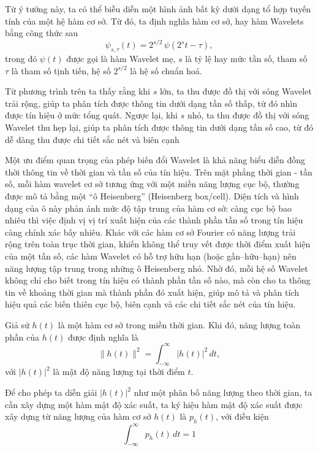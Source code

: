 \documentclass[12pt, a4paper]{report}
\begin{document}
Từ ý tưởng này, ta có thể biễu diễn một hình ảnh bất kỳ dưới dạng tổ hợp tuyến tính của một hệ hàm cơ sở. Từ đó, ta định nghĩa hàm cơ sở, hay hàm Wavelets bằng công thức sau
\begin{equation}
    \psi_{s,\tau}(t) = 2^{s/2}\,\psi(2^{s} t - \tau),
\end{equation}
trong đó $\psi(t)$ được gọi là hàm Wavelet mẹ, 
$s$ là tỷ lệ hay mức tần số, tham số $\tau$ là tham số tịnh tiến, hệ số $2^{s/2}$ là hệ số chuẩn hoá.

Từ phương trình trên ta thấy rằng khi $s$ lớn, ta thu được đồ thị với sóng Wavelet trải rộng, giúp ta phân tích được thông tin dưới dạng tần số thấp, từ đó nhìn được tín hiệu ở mức tổng quát. Ngược lại, khi $s$ nhỏ, ta thu được đồ thị với sóng Wavelet thu hẹp lại, giúp ta phân tích được thông tin dưới dạng tần số cao, từ đó dễ dàng thu được chi tiết sắc nét và biên cạnh

Một ưu điểm quan trọng của phép biến đổi Wavelet là khả năng biểu diễn đồng thời thông tin về thời gian và tần số của tín hiệu. Trên mặt phẳng thời gian - tần số, mỗi hàm wavelet cơ sở tương ứng với một miền năng lượng cục bộ, thường được mô tả bằng một “ô Heisenberg” (Heisenberg box/cell). Diện tích và hình dạng của ô này phản ánh mức độ tập trung của hàm cơ sở: càng cục bộ bao nhiêu thì việc định vị vị trí xuất hiện của các thành phần tần số trong tín hiệu càng chính xác bấy nhiêu. Khác với các hàm cơ sở Fourier có năng lượng trải rộng trên toàn trục thời gian, khiến không thể truy vết được thời điểm xuất hiện của một tần số, các hàm Wavelet có hỗ trợ hữu hạn (hoặc gần–hữu–hạn) nên năng lượng tập trung trong những ô Heisenberg nhỏ. Nhờ đó, mỗi hệ số Wavelet không chỉ cho biết trong tín hiệu có thành phần tần số nào, mà còn cho ta thông tin về khoảng thời gian mà thành phần đó xuất hiện, giúp mô tả và phân tích hiệu quả các biến thiên cục bộ, biên cạnh và các chi tiết sắc nét của tín hiệu.

Giả sử $h(t)$ là một hàm cơ sở trong miền thời gian. 
Khi đó, năng lượng toàn phần của $h(t)$ được định nghĩa là 
\begin{equation} \label{nangluongtoanphan}
    \|h(t)\|^{2} = \int_{-\infty}^{\infty} |h(t)|^{2}\,dt,
\end{equation}
với $|h(t)|^2$ là mật độ năng lượng tại thời điểm $t$.

Để cho phép ta diễn giải $|h(t)|^2$ như một phân bố năng lượng theo thời gian, ta cần xây dựng một hàm mật độ xác suất, ta ký hiệu hàm mật độ xác suất được xây dựng từ năng lượng của hàm cơ sở $h(t)$ là $p_h(t)$, với điều kiện
\begin{equation} \label{dkhammatdoxacsuat}
    \int_{-\infty}^{\infty} p_h(t)\,dt = 1
\end{equation}
\end{document}
